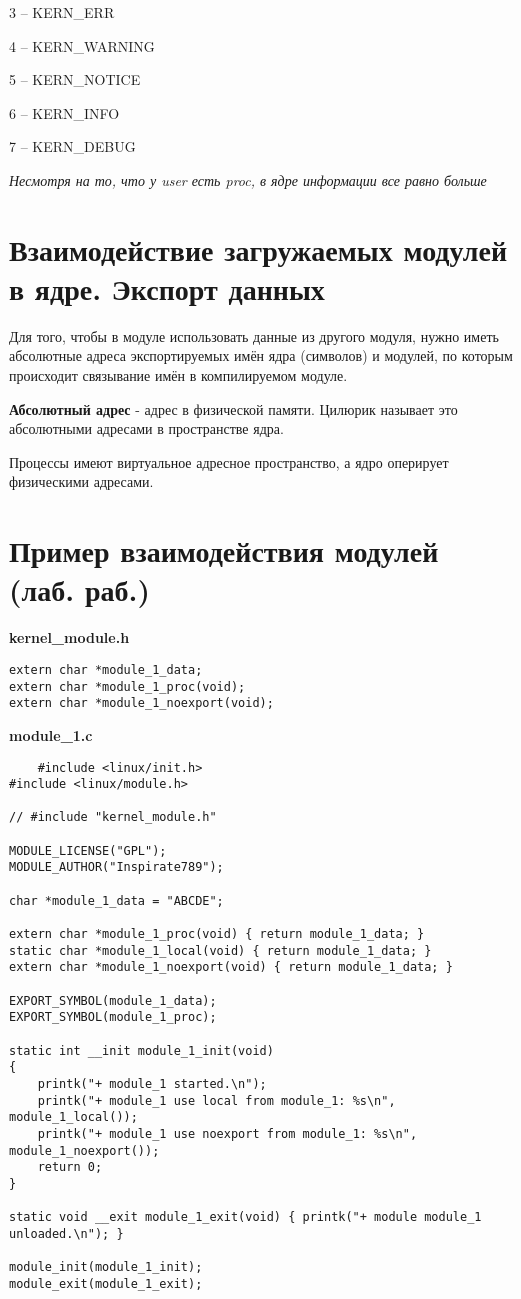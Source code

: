 3 -- KERN\_ERR 

4 -- KERN\_WARNING 

5 -- KERN\_NOTICE 

6 -- KERN\_INFO 

7 -- KERN\_DEBUG 


\textit{Несмотря на то, что у user есть proc, в ядре информации все равно больше}

\section{Взаимодействие загружаемых модулей в ядре. Экспорт данных}

Для того, чтобы в модуле использовать данные из другого модуля, нужно иметь абсолютные адреса экспортируемых имён ядра (символов) и модулей, по которым происходит связывание имён в компилируемом модуле.

\textbf{Абсолютный адрес} - адрес в физической памяти. Цилюрик называет это абсолютными адресами в пространстве ядра.

Процессы имеют виртуальное адресное пространство, а ядро оперирует физическими адресами.

\section{Пример взаимодействия модулей (лаб. раб.)}
\textbf{kernel\_module.h}
\begin{lstlisting}
extern char *module_1_data;
extern char *module_1_proc(void);
extern char *module_1_noexport(void);
\end{lstlisting}

\textbf{module\_1.c}
\begin{lstlisting}
    #include <linux/init.h>
#include <linux/module.h>

// #include "kernel_module.h"

MODULE_LICENSE("GPL");
MODULE_AUTHOR("Inspirate789");

char *module_1_data = "ABCDE";

extern char *module_1_proc(void) { return module_1_data; }
static char *module_1_local(void) { return module_1_data; }
extern char *module_1_noexport(void) { return module_1_data; }

EXPORT_SYMBOL(module_1_data);
EXPORT_SYMBOL(module_1_proc);

static int __init module_1_init(void)
{
    printk("+ module_1 started.\n");
    printk("+ module_1 use local from module_1: %s\n", module_1_local());
    printk("+ module_1 use noexport from module_1: %s\n", module_1_noexport());
    return 0;
}

static void __exit module_1_exit(void) { printk("+ module module_1 unloaded.\n"); }

module_init(module_1_init);
module_exit(module_1_exit);
\end{lstlisting}

